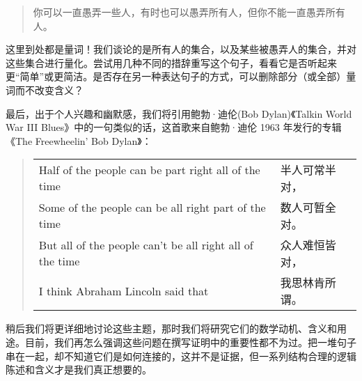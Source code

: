 \begin{quote}
    你可以一直愚弄一些人，有时也可以愚弄所有人，但你不能一直愚弄所有人。
\end{quote}

这里到处都是量词！我们谈论的是所有人的集合，以及某些被愚弄人的集合，并对这些集合进行量化。尝试用几种不同的措辞重写这个句子，看看它是否听起来更``简单''或更简洁。是否存在另一种表达句子的方式，可以删除部分（或全部）量词而不改变含义？

最后，出于个人兴趣和幽默感，我们将引用鲍勃·迪伦(Bob Dylan)《Talkin World War III Blues》中的一句类似的话，这首歌来自鲍勃·迪伦 1963 年发行的专辑《The Freewheelin' Bob Dylan》：

\begin{quote}
    \begin{tabular}{ll}
    Half of the people can be part right all of the time & 半人可常半对，\\
    Some of the people can be all right part of the time & 数人可暂全对。\\
    But all of the people can't be all right all of the time & 众人难恒皆对，\\
    I think Abraham Lincoln said that & 我思林肯所谓。
    \end{tabular}
\end{quote}

稍后我们将更详细地讨论这些主题，那时我们将研究它们的数学动机、含义和用途。目前，我们再怎么强调这些问题在撰写证明中的重要性都不为过。把一堆句子串在一起，却不知道它们是如何连接的，这并不是证据，但一系列结构合理的逻辑陈述和含义才是我们真正想要的。
